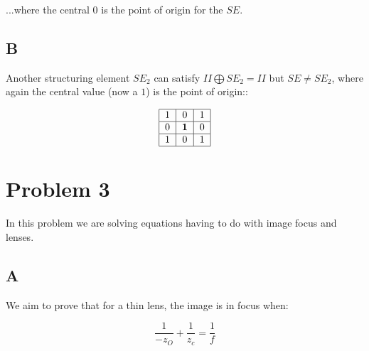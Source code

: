 \documentclass{article}
\begin{document}
\noindent ...where the central $0$ is the point of origin for the $SE$.

\subsection*{B}

Another structuring element $SE_2$ can satisfy $II\bigoplus SE_2 = II$ but $SE\neq SE_2$, where again the central value (now a $1$) is the point of origin::

\begin{equation}
    \begin{tabular}{ | c | c | c | }
        \hline
        1 & 0 & 1 \\
        \hline
        0 & \textbf{1} & 0 \\
        \hline
        1 & 0 & 1 \\
        \hline
    \end{tabular}
\end{equation}


\section*{Problem 3}

In this problem we are solving equations having to do with image focus and lenses.

\subsection*{A}

We aim to prove that for a thin lens, the image is in focus when:

\begin{equation}
    \frac{1}{-z_O} + \frac{1}{z_c} = \frac{1}{f}
\end{equation}
\end{document}

